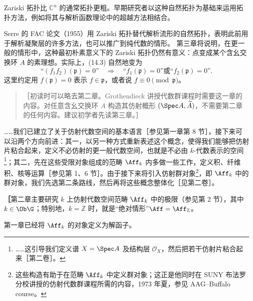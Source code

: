 Zariski 拓扑比 $\mathbb C^n$ 的通常拓扑更粗。早期研究者以这种自然拓扑为基础来运用拓扑方法，例如将其与解析函数理论中的超越方法相结合。

Serre 的 FAC 论文（1955）用 Zariski 拓扑替代解析流形的自然拓扑，表明此前用于解析凝聚层的许多方法，也可以推广到纯代数的情形。
第三章将说明，在更一般的情形中，这种最初朴素意义下的 Zariski 拓扑仍然有意义：点变成某个含幺交换环 $A$ 的素理想。实际上，(14.3) 自然地变为
\begin{equation}\tag{14.3$'$}
\text{“$(f_1f_2)(\mathfrak p)=0$”}\quad\Longrightarrow\quad
\text{“$f_1(\mathfrak p)=0$”或“$f_2(\mathfrak p)=0$”}.
\end{equation}
这里约定用 $f(\mathfrak p)=0$ 表示 $f\in\mathfrak p$，或者说 $f\equiv0\pmod{\mathfrak p}$。

\begin{quote}
［初读时可以略去第二章。Grothendieck 讲授代数群课程时需要这一章的内容。对任意含幺交换环 $A$ 构造其仿射概形 $(\Spec A,\widetilde A)$，不需要第二章的任何内容。建议初学者先读第三章。］
\end{quote}

……我们已建立了关于仿射代数空间的基本语言［参见第一章第 8 节］，接下来可以沿两个方向前进：其一，以另一种方式重新表述这个概念，使得我们能够把仿射片粘合起来，定义不必仿射的更一般代数空间，也就是不必由 $k$-代数表示的空间\footnote{……这引导我们定义谱 $X=\Spec A$ 及结构层 $\mathcal O_X$，然后把若干仿射片粘合起来［第二卷］。}；其二，先在这些受限对象组成的范畴 $\Aff_k$ 内多做一些工作，定义积、纤维积、核等运算［参见第 1、6 节］。由于接下来将引入仿射群对象\footnote{这些构造有助于在范畴 $\Aff_k$ 中定义群对象；这正是他同时在 SUNY 布法罗分校讲授的仿射代数群课程所需的内容，1973 年夏，参见 AAG--Buffalo course。}，即 $\Aff_k$ 中的群对象，我们先选第二条路线，然后再将这些概念整体化［见第二卷］。

\textbf{［}第二章主要研究 $k$ 上仿射代数空间范畴 $\Aff_k$ 中的极限（参见第 2 节），其中 $k\in\Ob\G$；特别地，$k=\mathbb Z$ 时，就是“绝对情形”$\Aff=\Aff_{\mathbb Z}$。

第一章已经将 $\Aff_k$ 的对象定义为解函子。
